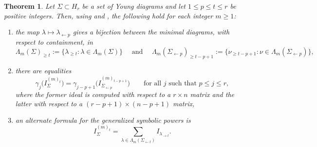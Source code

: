 \documentclass[11pt, reqno]{amsart}
\numberwithin{equation}{section}
\newtheorem{theorem}{Theorem}[section]
\theoremstyle{definition}
\renewcommand{\l}{\lambda}
\begin{document}
\begin{theorem}\label{prop: sigma'}
Let $\Sigma\subset H_r$ be a set of Young diagrams and let $1\leq p\leq t\leq r$ be positive integers. Then, using  and , the following hold for each integer $m\geq1$:
\begin{enumerate}
\item the map $\l\mapsto\l_{\leftarrow p}$ gives a bijection between the minimal diagrams, with respect to containment, in
\[
\Lambda_m(\Sigma)_{\geq t}:=\{\lambda_{\geq t}:\lambda\in\Lambda_m(\Sigma) \}
\quad \text{ and } \quad
\Lambda_m(\Sigma_{\leftarrow p})_{\geq t-p+1}
 :=\{\nu_{\geq t-p+1}:\nu\in\Lambda_m(\Sigma_{\leftarrow p})\},
\]
\item  there are equalities
\[
\gamma_j\bigl(I_\Sigma^{(m)_t}\bigr)
 =\gamma_{j-p+1}\bigl(I_{\Sigma_{\leftarrow p}}^{(m)_{t-p+1}}\bigr)
 \qquad\text{for all }j \text{ such that } p\leq j\leq r,
\]
where the former ideal is computed with respect to a $r\times n$ matrix and the latter with respect to a $(r-p+1)\times (n-p+1)$ matrix,
\item an alternate formula for the generalized symbolic powers is
\[
I_\Sigma^{(m)_t}=\sum_{\lambda\in\Lambda_m(\Sigma_{\leftarrow t})}I_{\lambda_{\rightarrow t}}.
\]
\end{enumerate}
\end{theorem}
\end{document}

